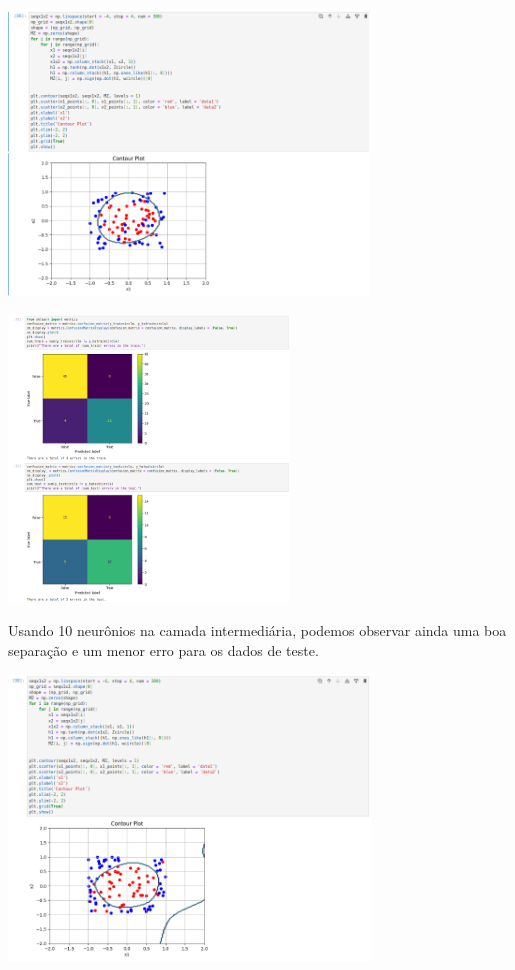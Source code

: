 \documentclass{article}
\begin{document}
\begin{center}

\includegraphics[height=3in]{exercise_pic/circle/plot_graph_circle_5.png}
\vspace{10pt}

\end{center}


\begin{center}

\includegraphics[height=3in]{exercise_pic/circle/conf_matrix_circle_5.png}
\vspace{10pt}
    
\end{center}
Usando 10 neurônios na camada intermediária, podemos observar ainda uma boa separação e um menor erro para os dados de teste.

\begin{center}

\includegraphics[height=3in]{exercise_pic/circle/plot_graph_10.png}
\vspace{10pt}

\end{center}
\end{document}
